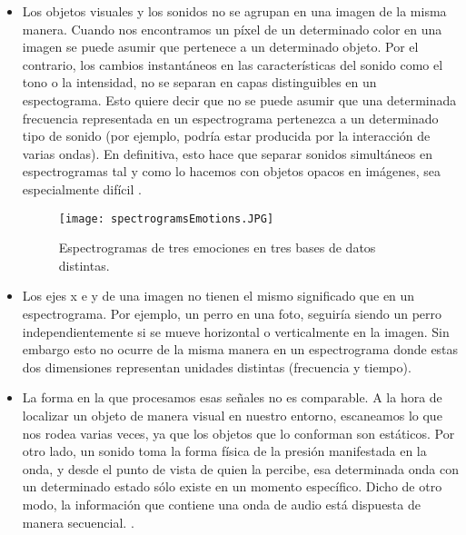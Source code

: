 \documentclass[11pt,a4paper,spanish]{book}
\begin{document}
	\begin{itemize}
		\item Los objetos visuales y los sonidos no se agrupan en una imagen de la misma manera. Cuando nos encontramos un píxel de un determinado color en una imagen se puede asumir que pertenece a un determinado objeto. Por el contrario, los cambios instantáneos en las características del sonido como el tono o la intensidad, no se separan en capas distinguibles en un espectograma. Esto quiere decir que no se puede asumir que una determinada frecuencia representada en un espectrograma pertenezca a un determinado tipo de sonido (por ejemplo, podría estar producida por la interacción de varias ondas). En definitiva, esto hace que separar sonidos simultáneos en espectrogramas tal y como lo hacemos con objetos opacos en imágenes, sea especialmente difícil \cite{Wyse2017}. %
		
		\begin{figure}[H]
			\centering
			\texttt{[image: spectrogramsEmotions.JPG]} 
			\caption{Espectrogramas de tres emociones en tres bases de datos distintas.}
			\label{fig:spectroEmo}
		\end{figure}
		
		\item Los ejes x e y de una imagen no tienen el mismo significado que en un espectrograma. Por ejemplo, un perro en una foto, seguiría siendo un perro independientemente si se mueve horizontal o verticalmente en la imagen. Sin embargo esto no ocurre de la misma manera en un espectrograma donde estas dos dimensiones representan unidades distintas (frecuencia y tiempo)\cite{spectrograms2021}.
		
		\item La forma en la que procesamos esas señales no es comparable. A la hora de localizar un objeto de manera visual en nuestro entorno, escaneamos lo que nos rodea varias veces, ya que los objetos que lo conforman son estáticos. 
		Por otro lado, un sonido toma la forma física de la presión manifestada en la onda, y desde el punto de vista de quien la percibe, esa determinada onda con un determinado estado sólo existe en un momento específico. Dicho de otro modo, la información que contiene una onda de audio está dispuesta de manera secuencial.
		\cite{JHui2019}.
		
	\end{itemize} 
	

	
	
	
	
	
	
	
	\printbibliography
	
\end{document}
